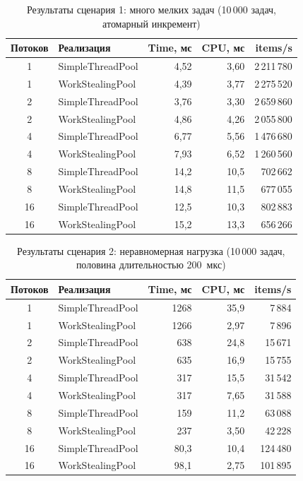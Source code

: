 \begin{table}[h]
\caption{Результаты сценария 1: много мелких задач
         (10\,000 задач, атомарный инкремент)}
\label{tab:results-small}
\begin{tabular}{|c|l|r|r|r|}
\hline
\textbf{Потоков} &
\textbf{Реализация} &
\textbf{Time, мс} &
\textbf{CPU, мс} &
\textbf{items/s} \\
\hline
1  & SimpleThreadPool  & 4,52 & 3,60 & 2\,211\,780 \\
1  & WorkStealingPool  & 4,39 & 3,77 & 2\,275\,520 \\
\hline
2  & SimpleThreadPool  & 3,76 & 3,30 & 2\,659\,860 \\
2  & WorkStealingPool  & 4,86 & 4,26 & 2\,055\,800 \\
\hline
4  & SimpleThreadPool  & 6,77 & 5,56 & 1\,476\,680 \\
4  & WorkStealingPool  & 7,93 & 6,52 & 1\,260\,560 \\
\hline
8  & SimpleThreadPool  & 14,2 & 10,5 & 702\,662   \\
8  & WorkStealingPool  & 14,8 & 11,5 & 677\,055   \\
\hline
16 & SimpleThreadPool  & 12,5 & 10,3 & 802\,883   \\
16 & WorkStealingPool  & 15,2 & 13,3 & 656\,266   \\
\hline
\end{tabular}
\end{table}

\begin{table}[h]
\caption{Результаты сценария 2: неравномерная нагрузка
         (10\,000 задач, половина длительностью 200~мкс)}
\label{tab:results-uneven}
\begin{tabular}{|c|l|r|r|r|}
\hline
\textbf{Потоков} &
\textbf{Реализация} &
\textbf{Time, мс} &
\textbf{CPU, мс} &
\textbf{items/s} \\
\hline
1  & SimpleThreadPool  & 1268 & 35,9 & 7\,884  \\
1  & WorkStealingPool  & 1266 & 2,97 & 7\,896  \\
\hline
2  & SimpleThreadPool  & 638  & 24,8 & 15\,671 \\
2  & WorkStealingPool  & 635  & 16,9 & 15\,755 \\
\hline
4  & SimpleThreadPool  & 317  & 15,5 & 31\,542 \\
4  & WorkStealingPool  & 317  & 7,65 & 31\,588 \\
\hline
8  & SimpleThreadPool  & 159  & 11,2 & 63\,088 \\
8  & WorkStealingPool  & 237  & 3,50 & 42\,228 \\
\hline
16 & SimpleThreadPool  & 80,3 & 10,4 & 124\,480 \\
16 & WorkStealingPool  & 98,1 & 2,75 & 101\,895 \\
\hline
\end{tabular}
\end{table}

